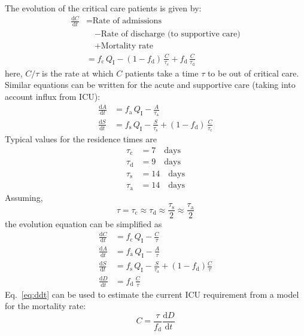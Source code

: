 \documentclass{article}
\newcommand{\rmd}{{\mathrm{d}}}
\newcommand{\der}[2]{\ensuremath{\frac{\rmd #1}{\rmd #2}}}
\newcommand{\fd}{\ensuremath{f_{\mathrm{d}}}}
\newcommand{\fc}{\ensuremath{f_{\mathrm{c}}}}
\newcommand{\fa}{\ensuremath{f_{\mathrm{a}}}}
\newcommand{\fs}{\ensuremath{f_{\mathrm{s}}}}
\newcommand{\taud}{\ensuremath{\tau_{\mathrm{d}}}}
\newcommand{\tauc}{\ensuremath{\tau_{\mathrm{c}}}}
\newcommand{\taua}{\ensuremath{\tau_{\mathrm{a}}}}
\newcommand{\taus}{\ensuremath{\tau_{\mathrm{s}}}}
\newcommand{\Qi}{\ensuremath{Q_{\mathrm{I}}}}
\begin{document}
The evolution of the critical care patients is given by:
\begin{equation}
  \label{eq:C}
  \begin{split}
\der{C}{t}
  &= \text{Rate of admissions}\\
  & \quad - \text{Rate of discharge (to supportive care)}\\
  & \quad + \text{Mortality rate} \\
  & = \fc \, \Qi
    - (1-\fd) \, \frac{C}{\tauc}
    + \fd \, \frac{C}{\taud}
  \end{split}
\end{equation}
here, $C/\tau$ is the rate at which $C$ patients take a time $\tau$ to
be out of critical care. Similar equations can be written for the
acute and supportive care (taking into account influx from ICU):
\begin{align}
  \der{A}{t} & = \fa \, \Qi - \frac{A}{\taua} \\
  \der{S}{t} & = \fs \, \Qi - \frac{S}{\taus} + (1-\fd) \,
               \frac{C}{\tauc} 
\end{align}
Typical values for the residence times are
\begin{align}
  \tauc &= 7 \quad\text{days} \\
  \taud &= 9 \quad\text{days} \\
  \taus &= 14 \quad\text{days} \\
  \taua &= 14 \quad\text{days} 
\end{align}
Assuming,
\begin{equation}
  \tau = \tauc \approx \taud \approx \frac{\taus}{2} \approx \frac{\taua}{2}
\end{equation}
the evolution equation can be simplified as
\begin{align}
  \der{C}{t} & = \fc \, \Qi - \frac{C}{\tau} \\
  \der{A}{t} & = \fa \, \Qi - \frac{A}{\tau} \\
  \der{S}{t} & = \fs \, \Qi - \frac{S}{\taua} + (1-\fd) \frac{C}{\tau}
  \\
  \label{eq:ddt}
  \der{D}{t} & = \fd \, \frac{C}{\tau} 
\end{align}
Eq.~\eqref{eq:ddt} can be used to estimate the current ICU requirement
from a model for the mortality rate:
\begin{equation}
  C = \frac{\tau}{\fd} \der{D}{t} 
\end{equation}



\end{document}
